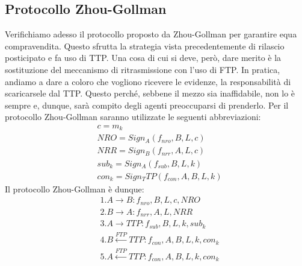 \subsection{Protocollo Zhou-Gollman}
Verifichiamo adesso il protocollo proposto da Zhou-Gollman per garantire equa compravendita. Questo sfrutta la strategia vista precedentemente di rilascio posticipato e fa uso di TTP. Una cosa di cui si deve, però, dare merito è la sostituzione del meccanismo di ritrasmissione con l'uso di FTP. In pratica, andiamo a dare a coloro che vogliono ricevere le evidenze, la responsabilità di scaricarsele dal TTP. Questo perché, sebbene il mezzo sia inaffidabile, non lo è sempre e, dunque, sarà compito degli agenti preoccuparsi di prenderlo.
Per il protocollo Zhou-Gollman saranno utilizzate le seguenti abbreviazioni:
\begin{align*}
    &c = m_k\\
    &NRO = Sign_A(f_{nro},B,L,c)\\
    &NRR = Sign_B(f_{nrr},A,L,c)\\
    &sub_k = Sign_A(f_{sub},B,L,k)\\
    &con_k = Sign_TTP(f_{con},A,B,L,k)
\end{align*}
Il protocollo Zhou-Gollman è dunque:
\begin{align*}
    &1. A \to B: f_{nro},B,L,c,NRO\\
    &2. B \to A: f_{nrr}, A, L,NRR\\
    &3. A \to TTP: f_{sub},B,L,k,sub_k\\
    &4. B \xleftarrow{FTP} TTP:f_{con},A,B,L,k,con_k\\
    &5. A \xleftarrow{FTP} TTP:f_{con},A,B,L,k,con_k
\end{align*}

